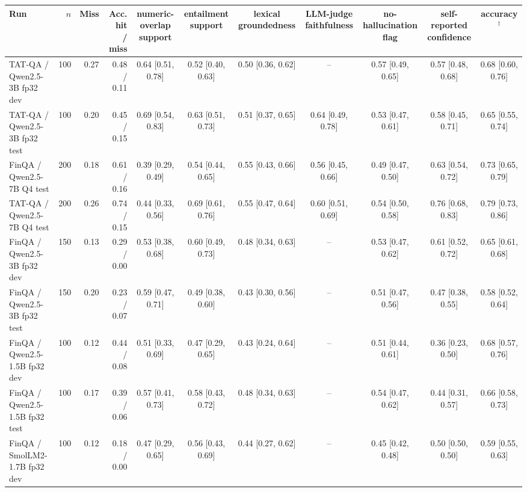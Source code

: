 \begin{tabular}{@{}l r r r ccccccc@{}}
\toprule
Run & $n$ & Miss & Acc. hit / miss & numeric-overlap support & entailment support & lexical groundedness & LLM-judge faithfulness & no-hallucination flag & self-reported confidence & accuracy$^\dagger$ \\
\midrule
TAT-QA / Qwen2.5-3B fp32 dev & 100 & 0.27 & 0.48 / 0.11 & 0.64 \small[0.51, 0.78] & 0.52 \small[0.40, 0.63] & 0.50 \small[0.36, 0.62] & -- & 0.57 \small[0.49, 0.65] & 0.57 \small[0.48, 0.68] & 0.68 \small[0.60, 0.76] \\
TAT-QA / Qwen2.5-3B fp32 test & 100 & 0.20 & 0.45 / 0.15 & 0.69 \small[0.54, 0.83] & 0.63 \small[0.51, 0.73] & 0.51 \small[0.37, 0.65] & 0.64 \small[0.49, 0.78] & 0.53 \small[0.47, 0.61] & 0.58 \small[0.45, 0.71] & 0.65 \small[0.55, 0.74] \\
FinQA / Qwen2.5-7B Q4 test & 200 & 0.18 & 0.61 / 0.16 & 0.39 \small[0.29, 0.49] & 0.54 \small[0.44, 0.65] & 0.55 \small[0.43, 0.66] & 0.56 \small[0.45, 0.66] & 0.49 \small[0.47, 0.50] & 0.63 \small[0.54, 0.72] & 0.73 \small[0.65, 0.79] \\
TAT-QA / Qwen2.5-7B Q4 test & 200 & 0.26 & 0.74 / 0.15 & 0.44 \small[0.33, 0.56] & 0.69 \small[0.61, 0.76] & 0.55 \small[0.47, 0.64] & 0.60 \small[0.51, 0.69] & 0.54 \small[0.50, 0.58] & 0.76 \small[0.68, 0.83] & 0.79 \small[0.73, 0.86] \\
FinQA / Qwen2.5-3B fp32 dev & 150 & 0.13 & 0.29 / 0.00 & 0.53 \small[0.38, 0.68] & 0.60 \small[0.49, 0.73] & 0.48 \small[0.34, 0.63] & -- & 0.53 \small[0.47, 0.62] & 0.61 \small[0.52, 0.72] & 0.65 \small[0.61, 0.68] \\
FinQA / Qwen2.5-3B fp32 test & 150 & 0.20 & 0.23 / 0.07 & 0.59 \small[0.47, 0.71] & 0.49 \small[0.38, 0.60] & 0.43 \small[0.30, 0.56] & -- & 0.51 \small[0.47, 0.56] & 0.47 \small[0.38, 0.55] & 0.58 \small[0.52, 0.64] \\
FinQA / Qwen2.5-1.5B fp32 dev & 100 & 0.12 & 0.44 / 0.08 & 0.51 \small[0.33, 0.69] & 0.47 \small[0.29, 0.65] & 0.43 \small[0.24, 0.64] & -- & 0.51 \small[0.44, 0.61] & 0.36 \small[0.23, 0.50] & 0.68 \small[0.57, 0.76] \\
FinQA / Qwen2.5-1.5B fp32 test & 100 & 0.17 & 0.39 / 0.06 & 0.57 \small[0.41, 0.73] & 0.58 \small[0.43, 0.72] & 0.48 \small[0.34, 0.63] & -- & 0.54 \small[0.47, 0.62] & 0.44 \small[0.31, 0.57] & 0.66 \small[0.58, 0.73] \\
FinQA / SmolLM2-1.7B fp32 dev & 100 & 0.12 & 0.18 / 0.00 & 0.47 \small[0.29, 0.65] & 0.56 \small[0.43, 0.69] & 0.44 \small[0.27, 0.62] & -- & 0.45 \small[0.42, 0.48] & 0.50 \small[0.50, 0.50] & 0.59 \small[0.55, 0.63] \\

\end{tabular}
